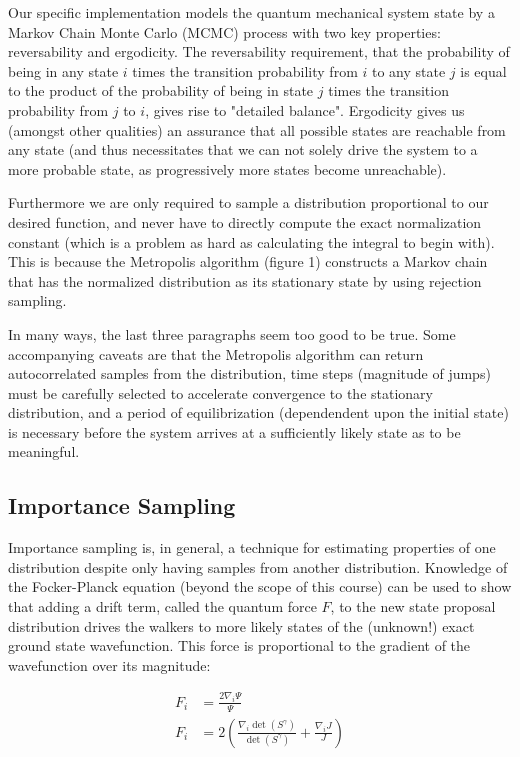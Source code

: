\documentclass[11pt, conference, compsocconf]{IEEEtran}
\begin{document}
Our specific implementation models the quantum mechanical system state by a Markov Chain Monte Carlo (MCMC) process with two key properties: reversability and ergodicity. The reversability requirement, that the probability of being in any state $i$ times the transition probability from $i$ to any state $j$ is equal to the product of the probability of being in state $j$ times the transition probability from $j$ to $i$, gives rise to "detailed balance". Ergodicity gives us (amongst other qualities) an assurance that all possible states are reachable from any state (and thus necessitates that we can not solely drive the system to a more probable state, as progressively more states become unreachable). 

Furthermore we are only required to sample a distribution proportional to our desired function, and never have to directly compute the exact normalization constant (which is a problem as hard as calculating the integral to begin with). This is because the Metropolis algorithm (figure 1) constructs a Markov chain that has the normalized distribution as its stationary state by using rejection sampling. 

In many ways, the last three paragraphs seem too good to be true. Some accompanying caveats are that the Metropolis algorithm can return autocorrelated samples from the distribution, time steps (magnitude of jumps) must be carefully selected to accelerate convergence to the stationary distribution, and a period of equilibrization (dependendent upon the initial state) is necessary before the system arrives at a sufficiently likely state as to be meaningful.

\subsection{Importance Sampling}
Importance sampling is, in general, a technique for estimating properties of one distribution despite only having samples from another distribution. Knowledge of the Focker-Planck equation (beyond the scope of this course) can be used to show that adding a drift term, called the quantum force $F$, to the new state proposal distribution drives the walkers to more likely states of the (unknown!) exact ground state wavefunction. This force is proportional to the gradient of the wavefunction over its magnitude:

\begin{align}F_i &= \frac{2\nabla_i \Psi}{\Psi}\\
F_i &= 2\left(\frac{\nabla_i \det\left(S^\gamma \right)}{\det\left(S^\gamma \right)} + \frac{\nabla_i J}{J}\right) \end{align}
\end{document}
